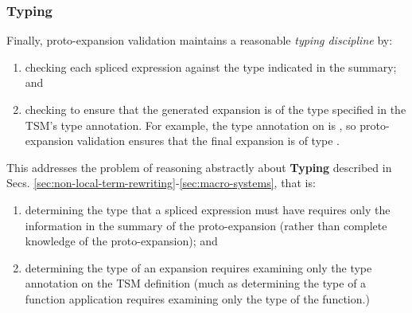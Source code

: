 \subsubsection{Typing}
Finally, proto-expansion validation maintains a reasonable \emph{typing discipline} by:
\begin{enumerate}
\item checking each spliced expression against the type indicated in the summary; and
\item checking to ensure that the generated expansion is of the type specified in the TSM's type annotation. For example, the type annotation on  is , so proto-expansion validation ensures that the final expansion is of type .
\end{enumerate}

 This addresses the problem of reasoning abstractly about \textbf{Typing} described in Secs. \ref{sec:non-local-term-rewriting}-\ref{sec:macro-systems}, that is:
 \begin{enumerate}
 \item determining the type that a spliced expression must have requires only the information in the summary of the proto-expansion (rather than complete knowledge of the proto-expansion); and 
 \item determining the type of an expansion requires examining only the type annotation on the TSM definition (much as determining the type of a function application requires examining only the type of the function.)
 \end{enumerate}






